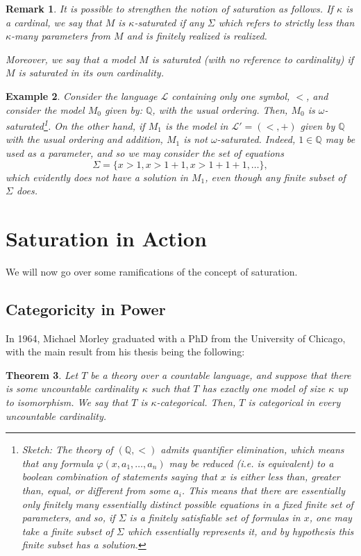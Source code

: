\documentclass{article}
\newtheorem{theorem}{Theorem}[section]
\newtheorem{remark}[theorem]{Remark}
\newtheorem{example}[theorem]{Example}
\theoremstyle{nonumberplain}
\newcommand{\Q}{\mathbb{Q}}
\newcommand{\Lang}{\mathcal{L}}
\begin{document}
\begin{remark}
It is possible to strengthen the notion of saturation as follows. If $\kappa$ is a cardinal, we say that $M$ is $\kappa$-saturated if any $\Sigma$ which refers to \emph{strictly less than} $\kappa$-many parameters from $M$ and is finitely realized is realized.

Moreover, we say that a model $M$ is saturated (with no reference to cardinality) if $M$ is saturated in its own cardinality.
\end{remark}

\begin{example}
Consider the language $\Lang$ containing only one symbol, $<$, and consider the model $M_0$ given by: $\Q$, with the usual ordering. Then, $M_0$ is $\omega$-saturated\footnote{Sketch: The theory of $(\Q,<)$ admits quantifier elimination, which means that any formula $\varphi(x,a_1, \dots, a_n)$ may be reduced (i.e. is equivalent) to a boolean combination of statements saying that $x$ is either less than, greater than, equal, or different from some $a_i$. This means that there are essentially only finitely many essentially distinct possible equations in a fixed finite set of parameters, and so, if $\Sigma$ is a finitely satisfiable set of formulas in $x$, one may take a finite subset of $\Sigma$ which essentially represents it, and by hypothesis this finite subset has a solution.}. On the other hand, if $M_1$ is the model in $\Lang' = (<,+)$ given by $\Q$ with the usual ordering and addition, $M_1$ is not $\omega$-saturated. Indeed, $1 \in \Q$ may be used as a parameter, and so we may consider the set of equations
\begin{equation}
\Sigma = \{ x > 1, x > 1+1, x>1+1+1, \dots \},
\end{equation}
which evidently does not have a solution in $M_1$, even though any finite subset of $\Sigma$ does.
\end{example}

\section{Saturation in Action}

We will now go over some ramifications of the concept of saturation.

\subsection{Categoricity in Power}

In 1964, Michael Morley graduated with a PhD from the University of Chicago, with the main result from his thesis \cite{morley} being the following:
\begin{theorem}
Let $T$ be a theory over a countable language, and suppose that there is some uncountable cardinality $\kappa$ such that $T$ has \emph{exactly} one model of size $\kappa$ up to isomorphism. We say that $T$ is \emph{$\kappa$-categorical}. Then, $T$ is categorical in every uncountable cardinality.
\end{theorem}
\end{document}

